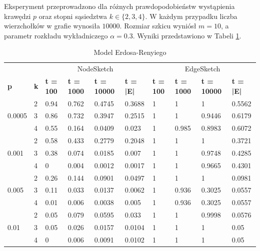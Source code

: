         Eksperyment przeprowadzono dla różnych prawdopodobieństw wystąpienia krawędzi $p$ oraz stopni sąsiedztwa $k \in \{2,3,4\}$. W każdym przypadku liczba wierzchołków w grafie wynosiła $10000$. Rozmiar szkicu wyniósł $m = 10$, a parametr rozkładu wykładniczego $\alpha = 0.3$. Wyniki przedstawiono w Tabeli \ref{tab:erdos_renyi}.

        \begin{table}[!ht]
        \small
            \centering
            \begin{tabular}{|l|l|l|l|l|l|l|l|l|l|}
            \hline
                & & \multicolumn{4}{c|}{NodeSketch} & \multicolumn{4}{c|}{EdgeSketch} \\ \cline{1-10}
                \textbf{p} & \textbf{k} & \textbf{t = 100} & \textbf{t = 1000} & \textbf{t = 10000} & \textbf{t = |E|} & \textbf{t = 100} & \textbf{t = 1000} & \textbf{t = 10000} & \textbf{t = |E|} \\ \hline\hline
                \multirow{3}{*}{0.0005} & 2 & 0.94 & 0.762 & 0.4745 & 0.3688 & 1	& 1	& 1	& 0.5562 \\ \cline{2-10}
                & 3 & 0.86 & 0.732 & 0.3947 & 0.2515	& 1	& 1	& 0.9446 &	0.6179 \\ \cline{2-10}
                & 4 & 0.55 & 0.164 & 0.0409 & 0.023	& 1	& 0.985 & 0.8983 & 0.6072 \\ \hline\hline
                \multirow{3}{*}{0.001} & 2 & 0.58 & 0.433 & 0.2779 & 0.2048	& 1	& 1	& 1	& 0.3721 \\ \cline{2-10}
                & 3 & 0.38 & 0.074 & 0.0185 & 0.007	& 1	& 1	& 0.9748 & 0.4285 \\ \cline{2-10}
                & 4 & 0 & 0.004 & 0.0012 & 0.0017 & 1 & 1 & 0.9665 & 0.4301 \\ \hline\hline
                \multirow{3}{*}{0.005} & 2 & 0.26 & 0.144 & 0.0901 & 0.0497	& 1	& 1	& 1	& 0.0981 \\ \cline{2-10}
                & 3 & 0.11 & 0.033	& 0.0137 & 0.0062 & 1 & 0.936 & 0.3025 & 0.0557 \\ \cline{2-10}
                & 4 & 0.01 & 0.006 & 0.0038 & 0.005	& 1	& 0.936	& 0.3025 & 0.0557 \\ \hline\hline
                \multirow{3}{*}{0.01} & 2 & 0.05 & 0.079 & 0.0595 & 0.033	& 1	& 1	& 0.9998 & 0.0576 \\ \cline{2-10}
                & 3 & 0.05 & 0.026 & 0.0157 & 0.0104	& 1	& 1	& 1	& 0.05 \\ \cline{2-10}
                & 4 & 0 & 0.006 & 0.0091 & 0.0102	& 1	& 1	& 1	& 0.05 \\ \hline
            \end{tabular}
            \caption{Model Erdosa-Renyiego}
            \label{tab:erdos_renyi}

        \end{table}

